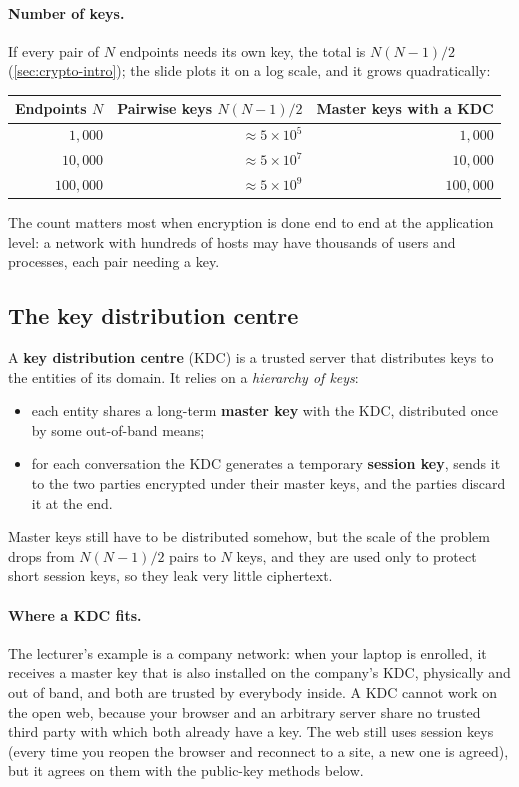 \paragraph{Number of keys.} If every pair of $N$ endpoints needs its own key, the total is $N(N-1)/2$ (\cref{sec:crypto-intro}); the slide plots it on a log scale, and it grows quadratically:
\begin{center}
\begin{tabular}{@{}rrr@{}}
\toprule
Endpoints $N$ & Pairwise keys $N(N-1)/2$ & Master keys with a KDC \\
\midrule
$1{,}000$   & $\approx 5 \times 10^{5}$ & $1{,}000$ \\
$10{,}000$  & $\approx 5 \times 10^{7}$ & $10{,}000$ \\
$100{,}000$ & $\approx 5 \times 10^{9}$ & $100{,}000$ \\
\bottomrule
\end{tabular}
\end{center}
The count matters most when encryption is done end to end at the application level: a network with hundreds of hosts may have thousands of users and processes, each pair needing a key.

\subsection{The key distribution centre}

\begin{definition}
A \textbf{key distribution centre} (KDC) is a trusted server that distributes keys to the entities of its domain. It relies on a \emph{hierarchy of keys}:
\begin{itemize}
    \item each entity shares a long-term \textbf{master key} with the KDC, distributed once by some out-of-band means;
    \item for each conversation the KDC generates a temporary \textbf{session key}, sends it to the two parties encrypted under their master keys, and the parties discard it at the end.
\end{itemize}
\end{definition}

Master keys still have to be distributed somehow, but the scale of the problem drops from $N(N-1)/2$ pairs to $N$ keys, and they are used only to protect short session keys, so they leak very little ciphertext.

\paragraph{Where a KDC fits.} The lecturer's example is a company network: when your laptop is enrolled, it receives a master key that is also installed on the company's KDC, physically and out of band, and both are trusted by everybody inside. A KDC cannot work on the open web, because your browser and an arbitrary server share no trusted third party with which both already have a key. The web still uses session keys (every time you reopen the browser and reconnect to a site, a new one is agreed), but it agrees on them with the public-key methods below.

